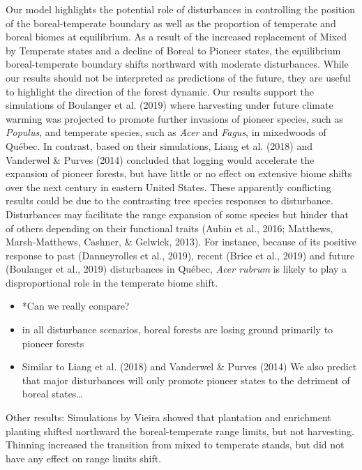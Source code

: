 \documentclass[a4paperpaper,]{article}
\begin{document}
Our model highlights the potential role of disturbances in controlling
the position of the boreal-temperate boundary as well as the proportion
of temperate and boreal biomes at equilibrium. As a result of the
increased replacement of Mixed by Temperate states and a decline of
Boreal to Pioneer states, the equilibrium boreal-temperate boundary
shifts northward with moderate disturbances. While our results should
not be interpreted as predictions of the future, they are useful to
highlight the direction of the forest dynamic. Our results support the
simulations of Boulanger et al. (2019) where harvesting under future
climate warming was projected to promote further invasions of pioneer
species, such as \emph{Populus}, and temperate species, such as
\emph{Acer} and \emph{Fagus}, in mixedwoods of Québec. In contrast,
based on their simulations, Liang et al. (2018) and Vanderwel \& Purves
(2014) concluded that logging would accelerate the expansion of pioneer
forests, but have little or no effect on extensive biome shifts over the
next century in eastern United States. These apparently conflicting
results could be due to the contrasting tree species responses to
disturbance. Disturbances may facilitate the range expansion of some
species but hinder that of others depending on their functional traits
(Aubin et al., 2016; Matthews, Marsh-Matthews, Cashner, \& Gelwick,
2013). For instance, because of its positive response to past
(Danneyrolles et al., 2019), recent (Brice et al., 2019) and future
(Boulanger et al., 2019) disturbances in Québec, \emph{Acer rubrum} is
likely to play a disproportional role in the temperate biome shift.

\begin{itemize}
\item
  *Can we really compare?
\item
  in all disturbance scenarios, boreal forests are losing ground
  primarily to pioneer forests
\item
  Similar to Liang et al. (2018) and Vanderwel \& Purves (2014) We also
  predict that major disturbances will only promote pioneer states to
  the detriment of boreal states\ldots{}
\end{itemize}

Other results: Simulations by Vieira showed that plantation and
enrichment planting shifted northward the boreal-temperate range limits,
but not harvesting. Thinning increased the transition from mixed to
temperate stands, but did not have any effect on range limits shift.
\end{document}

